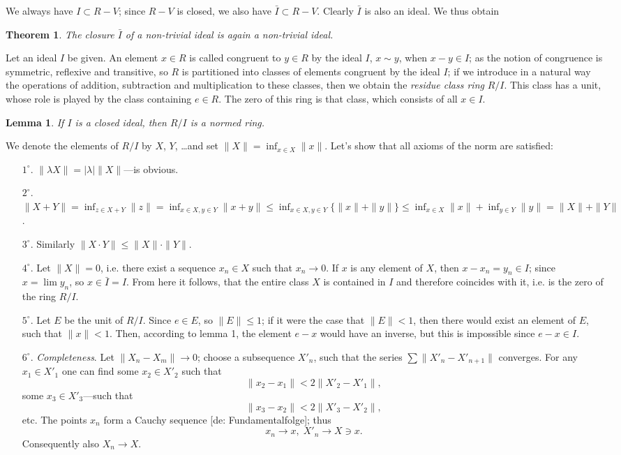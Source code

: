 \documentclass{article}
\newtheorem{theorem}{Theorem}
\newtheorem{lemma}{Lemma}
\theoremstyle{definition}
\begin{document}
We always have $I\subset R-V$; since $R-V$ is closed, we also have $\bar{I}\subset R-V$. Clearly $\bar{I}$ is also an ideal. We thus obtain
\begin{theorem}
  The closure $\bar{I}$ of a non-trivial ideal is again a non-trivial ideal.
\end{theorem}

Let an ideal $I$ be given. An element $x\in R$ is called congruent to $y\in R$ by the ideal $I$, $x\sim y$, when $x-y\in I$; as the notion of congruence is symmetric, reflexive and transitive, so $R$ is partitioned into classes of elements congruent by the ideal $I$; if we introduce in a natural way the operations of addition, subtraction and multiplication to these classes, then we obtain the \emph{residue class ring} $R/I$. This class has a unit, whose role is played by the class containing $e\in R$. The zero of this ring is that class, which consists of all $x\in I$.

\begin{lemma}
  If $I$ is a closed ideal, then $R/I$ is a normed ring.
\end{lemma}

We denote the elements of $R/I$ by $X$, $Y$, \dots and set $\|X\| = \inf_{x\in X} \|x\|$. Let's show that all axioms of the norm are satisfied:
\begin{enumerate}
\item [$1^\circ$.] $\|\lambda X\| = |\lambda| \|X\|$---is obvious.
\item [$2^\circ$.] $\|X+Y\| = \inf_{z\in X+Y} \|z\| = \inf_{x\in X, y\in Y} \|x + y\| \leq \inf_{x\in X, y\in Y} \{\|x\| + \|y\|\} \leq \inf_{x\in X} \|x\| + \inf_{y\in Y} \|y\| = \|X\| + \|Y\|$.
\item [$3^\circ$.] Similarly $\|X\cdot Y\| \leq \|X\|\cdot\|Y\|$.
\item [$4^\circ$.] Let $\|X\| = 0$, i.e. there exist a sequence $x_n\in X$ such that $x_n \to 0$. If $x$ is any element of $X$, then $x-x_n=y_n\in I$; since $x=\lim y_n$, so $x\in \bar{I}=I$. From here it follows, that the entire class $X$ is contained in $I$ and therefore coincides with it, i.e. is the zero of the ring $R/I$.
\item [$5^\circ$.] Let $E$ be the unit of $R/I$. Since $e\in E$, so $\|E\|\leq 1$; if it were the case that $\|E\|<1$, then there would exist an element of $E$, such that $\|x\|<1$. Then, according to lemma 1, the element $e-x$ would have an inverse, but this is impossible since $e-x\in I$.
\item [$6^\circ$.] \emph{Completeness}. Let $\|X_n-X_m\| \to 0$; choose a subsequence $X'_n$, such that the series $\sum\|X'_n-X'_{n+1}\|$ converges. For any $x_1\in X'_1$ one can find some $x_2\in X'_2$ such that
  $$ \|x_2-x_1\| < 2\|X'_2-X'_1\|, $$
  some $x_3\in X'_3$---such that
  $$ \|x_3-x_2\| < 2\|X'_3-X'_2\|, $$
  etc. The points $x_n$ form a Cauchy sequence [de: Fundamentalfolge]; thus
  $$ x_n \to x,\; X'_n\to X\ni x. $$
  Consequently also $X_n \to X$.
\end{enumerate}
\end{document}
